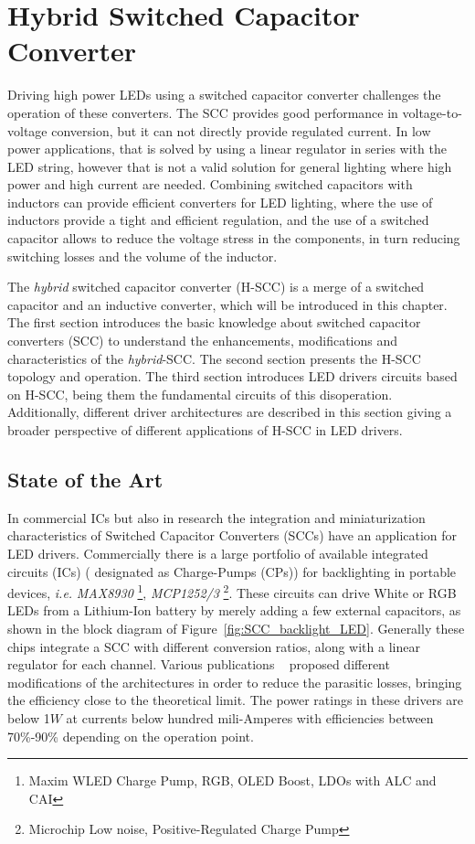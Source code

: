 \chapter{Hybrid Switched Capacitor Converter}

Driving high power LEDs using a switched capacitor converter challenges the operation of these converters. The SCC provides good performance in voltage-to-voltage conversion, but it can not directly provide regulated current. In low power applications, that is solved by using a linear regulator in series with the LED string, however that is not a valid solution for general lighting where high power and high current are needed. Combining switched capacitors with inductors can provide efficient converters for LED lighting, where the use of inductors provide a tight and efficient regulation, and the use of a switched capacitor allows to reduce the voltage stress in the components, in turn reducing switching losses and the volume of the inductor.

The \emph{hybrid} switched capacitor converter (H-SCC) is a merge of a switched capacitor and an inductive converter, which will be introduced in this chapter. The first section introduces the basic knowledge about switched capacitor converters (SCC) to understand the enhancements, modifications and characteristics of the \emph{hybrid}-SCC. The second section presents the H-SCC topology and  operation. The third section introduces LED drivers circuits based on H-SCC, being them the fundamental circuits of this disoperation. Additionally, different driver architectures are described in this section giving a broader perspective of different applications of H-SCC in LED drivers.


\section{State of the Art}
In  commercial ICs but also in research the integration and miniaturization characteristics of Switched Capacitor Converters (SCCs) have an application for LED drivers. Commercially there is a large portfolio of available integrated circuits (ICs) ( designated as Charge-Pumps (CPs))  for backlighting in portable devices, \emph{i.e.}  \emph{MAX8930} \footnote{Maxim\textsuperscript{\textregistered} WLED Charge Pump, RGB, OLED Boost, LDOs with ALC and CAI }, \emph{MCP1252/3} \footnote{Microchip\textsuperscript{\textregistered} Low noise, Positive-Regulated Charge Pump}. These circuits can drive White or RGB LEDs from a Lithium-Ion battery by merely adding a few external capacitors,  as shown in the block diagram of Figure~\ref{fig:SCC_backlight_LED}. Generally these chips integrate a SCC with different conversion ratios, along with a linear regulator for each channel. Various publications ~\cite{07Feng,09Wu,10Yin} proposed different modifications of the architectures in order to reduce the parasitic losses, bringing the efficiency close to the theoretical limit. The power ratings in these drivers are below 1$W$ at currents below hundred mili-Amperes with efficiencies between 70\%-90\% depending on the operation point.

